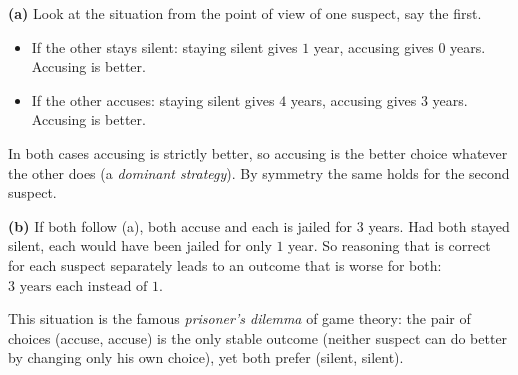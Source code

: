 \textbf{(a)} Look at the situation from the point of view of one suspect, say the first.
\begin{itemize}
\item If the other stays silent: staying silent gives $1$ year, accusing gives $0$ years. Accusing is better.
\item If the other accuses: staying silent gives $4$ years, accusing gives $3$ years. Accusing is better.
\end{itemize}
In both cases accusing is strictly better, so accusing is the better choice whatever the other does (a \emph{dominant strategy}). By symmetry the same holds for the second suspect.

\textbf{(b)} If both follow (a), both accuse and each is jailed for $3$ years. Had both stayed silent, each would have been jailed for only $1$ year. So reasoning that is correct for each suspect separately leads to an outcome that is worse for both: $\boxed{3\text{ years each instead of }1}$.

This situation is the famous \emph{prisoner's dilemma} of game theory: the pair of choices (accuse, accuse) is the only stable outcome (neither suspect can do better by changing only his own choice), yet both prefer (silent, silent).
